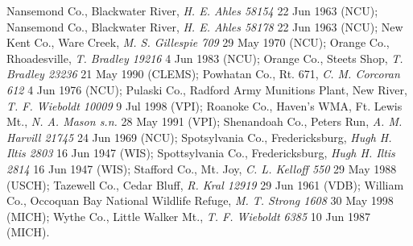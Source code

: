\documentclass{article}
\begin{document}
Nansemond Co., Blackwater River, \textit{H. E. Ahles 58154} 22 Jun 1963 (NCU);
Nansemond Co., Blackwater River, \textit{H. E. Ahles 58178} 22 Jun 1963 (NCU);
New Kent Co., Ware Creek, \textit{M. S. Gillespie 709} 29 May 1970 (NCU);
Orange Co., Rhoadesville, \textit{T. Bradley 19216} 4 Jun 1983 (NCU);
Orange Co., Steets Shop, \textit{T. Bradley 23236} 21 May 1990 (CLEMS);
Powhatan Co., Rt. 671, \textit{C. M. Corcoran 612} 4 Jun 1976 (NCU);
Pulaski Co., Radford Army Munitions Plant, New River, \textit{T. F. Wieboldt 10009} 9 Jul 1998 (VPI);
Roanoke Co., Haven's WMA, Ft. Lewis Mt., \textit{N. A. Mason s.n.} 28 May 1991 (VPI);
Shenandoah Co., Peters Run, \textit{A. M. Harvill 21745} 24 Jun 1969 (NCU);
Spotsylvania Co., Fredericksburg, \textit{Hugh H. Iltis 2803} 16 Jun 1947 (WIS);
Spottsylvania Co., Fredericksburg, \textit{Hugh H. Iltis 2814} 16 Jun 1947 (WIS);
Stafford Co., Mt. Joy, \textit{C. L. Kelloff 550} 29 May 1988 (USCH);
Tazewell Co., Cedar Bluff, \textit{R. Kral 12919} 29 Jun 1961 (VDB);
William Co., Occoquan Bay National Wildlife Refuge, \textit{M. T. Strong 1608} 30 May 1998 (MICH);
Wythe Co., Little Walker Mt., \textit{T. F. Wieboldt 6385} 10 Jun 1987 (MICH).
\end{document}
